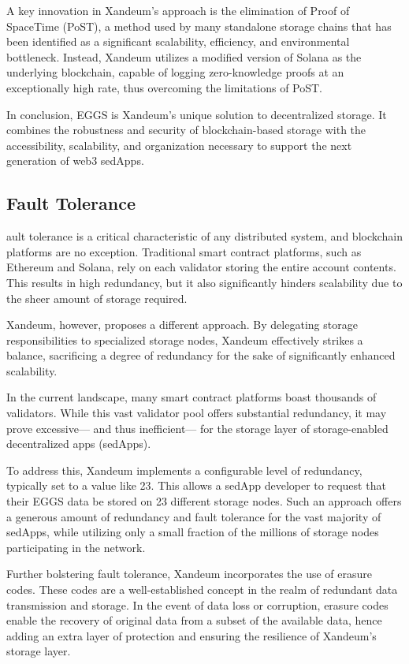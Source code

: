 \documentclass[11pt]{article}   	%
\begin{document}
A key innovation in Xandeum's approach is the elimination of Proof of SpaceTime (PoST), a method used by many standalone storage chains that has been identified as a significant scalability, efficiency, and environmental bottleneck. Instead, Xandeum utilizes a modified version of Solana as the underlying blockchain, capable of logging zero-knowledge proofs at an exceptionally high rate, thus overcoming the limitations of PoST.

In conclusion, EGGS is Xandeum's unique solution to decentralized storage. It combines the robustness and security of blockchain-based storage with the accessibility, scalability, and organization necessary to support the next generation of web3 sedApps.

\subsection{Fault Tolerance}
ault tolerance is a critical characteristic of any distributed system, and blockchain platforms are no exception. Traditional smart contract platforms, such as Ethereum and Solana, rely on each validator storing the entire account contents. This results in high redundancy, but it also significantly hinders scalability due to the sheer amount of storage required.

Xandeum, however, proposes a different approach. By delegating storage responsibilities to specialized storage nodes, Xandeum effectively strikes a balance, sacrificing a degree of redundancy for the sake of significantly enhanced scalability.

In the current landscape, many smart contract platforms boast thousands of validators. While this vast validator pool offers substantial redundancy, it may prove excessive— and thus inefficient— for the storage layer of storage-enabled decentralized apps (sedApps).

To address this, Xandeum implements a configurable level of redundancy, typically set to a value like 23. This allows a sedApp developer to request that their EGGS data be stored on 23 different storage nodes. Such an approach offers a generous amount of redundancy and fault tolerance for the vast majority of sedApps, while utilizing only a small fraction of the millions of storage nodes participating in the network.

Further bolstering fault tolerance, Xandeum incorporates the use of erasure codes. These codes are a well-established concept in the realm of redundant data transmission and storage. In the event of data loss or corruption, erasure codes enable the recovery of original data from a subset of the available data, hence adding an extra layer of protection and ensuring the resilience of Xandeum's storage layer.
\end{document}
